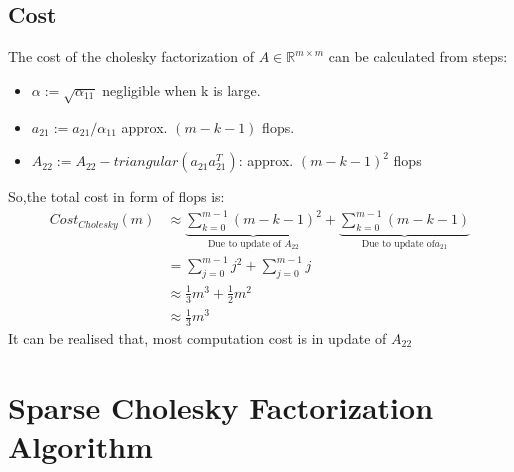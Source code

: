 \subsection*{Cost}
The cost of the cholesky factorization of $A\in \mathbb{R}^{m\times m}$ can be calculated from steps:
\begin{itemize}
	\item $\alpha := \sqrt{\alpha_{11}}$ negligible when k is large.
	\item $a_21 := a_{21}/\alpha_{11}$ approx. $(m-k-1)$ flops.
	\item $A_{22}:=A_{22}-triangular(a_{21}a_{21}^T)$: approx. $(m-k-1)^2$ flops
\end{itemize}
So,the total cost in form of flops is:
\begin{equation*}
	\begin{aligned}
		Cost_{Cholesky}(m) &\approx \underbrace{\sum_{k=0}^{m-1}{(m-k-1)^2} }_\textrm{Due to update of $A_{22}$} + \underbrace{\sum_{k=0}^{m-1}{(m-k-1)}}_\textrm{Due to update of$a_{21}$}\\
		&=\sum_{j=0}^{m-1}{j^2}+\sum_{j=0}^{m-1}{j}\\
		&\approx \frac{1}{3}m^3+\frac{1}{2}m^2\\
		&\approx \frac{1}{3}m^3
	\end{aligned}
\end{equation*}
It can be realised that, most computation cost is in update of $A_{22}$


\section{Sparse Cholesky Factorization Algorithm}





















































